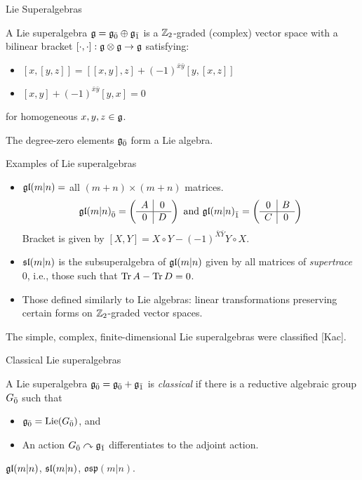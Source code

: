 \documentclass[handout]{beamer}
\begin{document}
\begin{frame}{Lie Superalgebras}
  \pause
  \begin{definition}
    A Lie superalgebra $\g = \even{\g} \oplus \odd{\g}$ is a $\ZZ_2$-graded (complex) vector space with a bilinear bracket $[\cdot,\cdot]: \g \otimes \g \to \g$ satisfying: \pause
    \begin{itemize}
    \item $[x,[y,z]] = [[x,y],z] + (-1)^{\bar x \bar y} [y,[x,z]]$\pause
    \item $[x,y] + (-1)^{\bar x \bar y} [y,x] = 0$
    \end{itemize}
    for homogeneous $x,y,z \in \g$.
  \end{definition}\pause
  \begin{example}
    The degree-zero elements $\even{\g}$ form a Lie algebra.
  \end{example}

\end{frame}

\begin{frame}{Examples of Lie superalgebras}
  \begin{itemize}
    \pause
  \item $\gl(m|n) = $ all $(m+n) \times (m+n)$ matrices.
    \[
\even{\gl(m|n)} = \left(
  \begin{array}{c|c}
    A & 0 \\
    \hline
    0 & D
  \end{array}
\right)
\text{ and } \odd{\gl(m|n)} = \left(
  \begin{array}{c|c}
    0 & B \\
    \hline
    C & 0
  \end{array}
\right)
\]
\pause
  Bracket is given by $[X,Y] = X \circ Y - (-1)^{\bar X \bar Y} Y \circ X$.
  \pause\item $\sl(m|n)$ is the subsuperalgebra of $\gl(m|n)$ given by all matrices of \emph{supertrace} 0, i.e., those such that $\Tr A - \Tr D = 0$.
  \pause\item Those defined similarly to Lie algebras: linear transformations preserving certain forms on $\ZZ_2$-graded vector spaces.
  \end{itemize}
\pause
  The simple, complex, finite-dimensional Lie superalgebras were classified [Kac].
\end{frame}

\begin{frame}{Classical Lie superalgebras}\pause
  \begin{definition}
  A Lie superalgebra $\even{\g} = \even{\g} +\odd{\g}$ is \emph{classical} if there is a reductive algebraic group $\even{G}$ such that
  \begin{itemize}
  \item $\even{\g} = \Lie(\even{G})$, and
  \item An action $\even{G} \actson \odd{\g}$ differentiates to the adjoint action.
  \end{itemize}
  \end{definition}\pause
  \begin{example}
    $\gl(m|n)$, $\sl(m|n)$, $\mathfrak{osp}(m|n)$.
  \end{example}
\end{frame}
\end{document}
